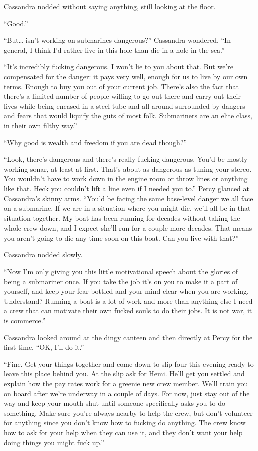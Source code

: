 \documentclass[]{scrbook}
\begin{document}
Cassandra nodded without saying anything, still looking at the floor.

``Good.''

``But\ldots{} isn't working on submarines dangerous?'' Cassandra
wondered. ``In general, I think I'd rather live in this hole than die in
a hole in the sea.''

``It's incredibly fucking dangerous. I won't lie to you about that. But
we're compensated for the danger: it pays very well, enough for us to
live by our own terms. Enough to buy you out of your current job.
There's also the fact that there's a limited number of people willing to
go out there and carry out their lives while being encased in a steel
tube and all-around surrounded by dangers and fears that would liquify
the guts of most folk. Submariners are an elite class, in their own
filthy way.''

``Why good is wealth and freedom if you are dead though?''

``Look, there's dangerous and there's really fucking dangerous. You'd be
mostly working sonar, at least at first. That's about as dangerous as
tuning your stereo. You wouldn't have to work down in the engine room or
throw lines or anything like that. Heck you couldn't lift a line even if
I needed you to.'' Percy glanced at Cassandra's skinny arms. ``You'd be
facing the same base-level danger we all face on a submarine. If we are
in a situation where you might die, we'll all be in that situation
together. My boat has been running for decades without taking the whole
crew down, and I expect she'll run for a couple more decades. That means
you aren't going to die any time soon on this boat. Can you live with
that?''

Cassandra nodded slowly.

``Now I'm only giving you this little motivational speech about the
glories of being a submariner once. If you take the job it's on you to
make it a part of yourself, and keep your fear bottled and your mind
clear when you are working. Understand? Running a boat is a lot of work
and more than anything else I need a crew that can motivate their own
fucked souls to do their jobs. It is not war, it is commerce.''

Cassandra looked around at the dingy canteen and then directly at Percy
for the first time. ``OK, I'll do it.''

``Fine. Get your things together and come down to slip four this evening
ready to leave this place behind you. At the slip ask for Hemi. He'll
get you settled and explain how the pay rates work for a greenie new
crew member. We'll train you on board after we're underway in a couple
of days. For now, just stay out of the way and keep your mouth shut
until someone specifically asks you to do something. Make sure you're
always nearby to help the crew, but don't volunteer for anything since
you don't know how to fucking do anything. The crew know how to ask for
your help when they can use it, and they don't want your help doing
things you might fuck up.''
\end{document}
